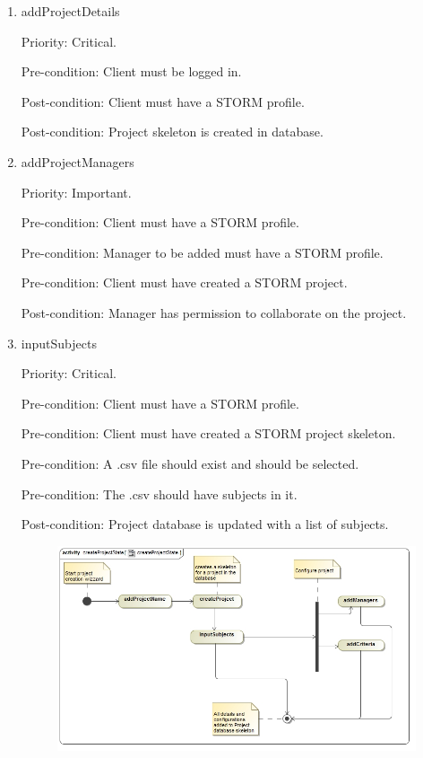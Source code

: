\begin{enumerate}
\item addProjectDetails\par
Priority: Critical.\par
Pre-condition: Client must be logged in.\par
Post-condition: Client must have a STORM profile.\par
Post-condition: Project skeleton is created in database.\par
\item addProjectManagers\par
Priority: Important.\par
Pre-condition: Client must have a STORM profile.\par
Pre-condition: Manager to be added must have a STORM profile.\par
Pre-condition: Client must have created a STORM project.\par
Post-condition: Manager has permission to collaborate on the project.\par
\item inputSubjects\par
Priority: Critical.\par
Pre-condition: Client must have a STORM profile.\par
Pre-condition: Client must have created a STORM project skeleton.\par
Pre-condition: A .csv file should exist and should be selected.\par
Pre-condition: The .csv should have subjects in it.\par
Post-condition: Project database is updated with a list of subjects.\par
\begin{figure}[h]
    \centering
    \includegraphics[width=15cm]{./graphics/createProjectState.jpg}

\end{figure}
\end{enumerate}
